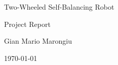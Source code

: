 \documentclass[11pt,a4paper]{article}
\begin{document}
\begin{titlepage}
  \centering
  \vspace*{3cm}
  {\LARGE Two-Wheeled Self-Balancing Robot\par}
  \vspace{0.6cm}
  {\large Project Report\par}
  \vspace{2.5cm}
  
  \vfill
  {\large Gian Mario Marongiu\par}
  \vspace{0.3cm}
  {\today\par}
  \vspace*{1.5cm}
\end{titlepage}

\tableofcontents
\clearpage







\end{document}
